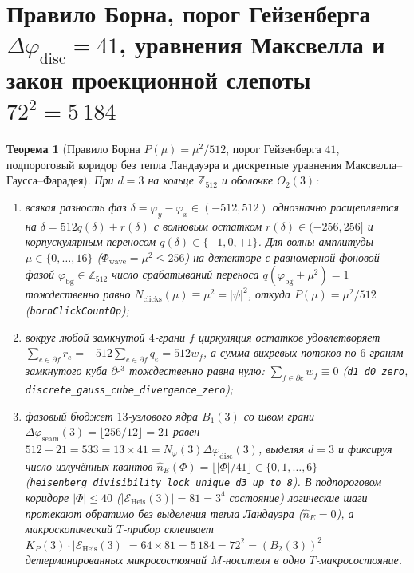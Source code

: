 \documentclass[11pt,a4paper]{article}
\theoremstyle{plain}
\newtheorem{theorem}{Теорема}[section]
\theoremstyle{definition}
\begin{document}
\section{Правило Борна, порог Гейзенберга \texorpdfstring{$\Delta\varphi_{\mathrm{disc}}=41$}{dphi=41}, уравнения Максвелла и закон проекционной слепоты \texorpdfstring{$72^2=5\,184$}{72^2=5184}}
\label{sec:born-maxwell-heisenberg}

\begin{theorem}[Правило Борна $P(\mu)=\mu^2/512$, порог Гейзенберга $41$, подпороговый коридор без тепла Ландауэра и дискретные уравнения Максвелла--Гаусса--Фарадея]
\label{thm:born-heisenberg-maxwell}
При $d=3$ на кольце $\mathbb{Z}_{512}$ и оболочке $O_2(3)$:
\begin{enumerate}[label=\textbf{(\roman*)},leftmargin=*]
\item всякая разность фаз $\delta = \varphi_y - \varphi_x\in(-512,512)$ однозначно расщепляется на $\delta = 512 q(\delta) + r(\delta)$ с волновым остатком $r(\delta)\in(-256,256]$ и корпускулярным переносом $q(\delta)\in\{-1,0,+1\}$. Для волны амплитуды $\mu\in\{0,\dots,16\}$ ($\Phi_{\mathrm{wave}} = \mu^2\le 256$) на детекторе с равномерной фоновой фазой $\varphi_{\mathrm{bg}}\in\mathbb{Z}_{512}$ число срабатываний переноса $q(\varphi_{\mathrm{bg}}+\mu^2)=1$ тождественно равно $N_{\mathrm{clicks}}(\mu) \equiv \mu^2 = |\psi|^2$, откуда $P(\mu) = \mu^2/512$ (\texttt{bornClickCountOp});
\item вокруг любой замкнутой $4$-грани $f$ циркуляция остатков удовлетворяет $\sum_{e\in\partial f} r_e = -512\sum_{e\in\partial f} q_e = 512 w_f$, а сумма вихревых потоков по $6$ граням замкнутого куба $\partial\square^3$ тождественно равна нулю: $\sum_{f\in\partial c} w_f \equiv 0$ (\texttt{d1\_d0\_zero}, \texttt{discrete\_gauss\_cube\_divergence\_zero});
\item фазовый бюджет $13$-узлового ядра $B_1(3)$ со швом грани $\Delta\varphi_{\mathrm{seam}}(3) = \lfloor 256/12\rfloor = 21$ равен $512 + 21 = 533 = 13\times 41 = N_\varphi(3)\Delta\varphi_{\mathrm{disc}}(3)$, выделяя $d=3$ и фиксируя число излучённых квантов $\hat{n}_E(\Phi) = \lfloor |\Phi|/41\rfloor \in \{0,1,\dots,6\}$ (\texttt{heisenberg\_divisibility\_lock\_unique\_d3\_up\_to\_8}). В подпороговом коридоре $|\Phi|\le 40$ ($|\mathcal{E}_{\mathrm{Heis}}(3)| = 81 = 3^4$ состояние) логические шаги протекают обратимо без выделения тепла Ландауэра ($\hat{n}_E = 0$), а макроскопический $T$-прибор склеивает $K_P(3)\cdot |\mathcal{E}_{\mathrm{Heis}}(3)| = 64\times 81 = 5\,184 = 72^2 = (B_2(3))^2$ детерминированных микросостояний $M$-носителя в одно $T$-макросостояние.
\end{enumerate}
\end{theorem}
\end{document}
